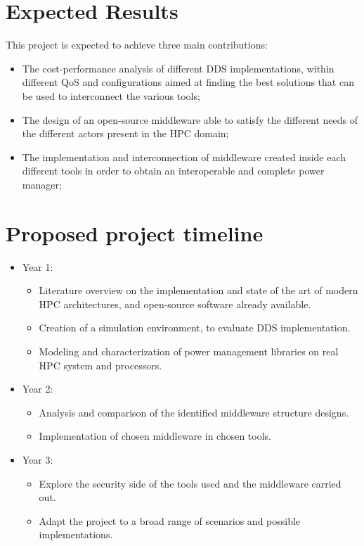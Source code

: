 \section{Expected Results}
This project is expected to achieve three main contributions:
\begin{itemize}
    \item The cost-performance analysis of different DDS implementations, within different QoS and configurations aimed at finding the best solutions that can be used to interconnect the various tools;

    \item The design of an open-source middleware able to satisfy the different needs of the different actors present in the HPC domain;

    \item The implementation and interconnection of middleware created inside each different tools in order to obtain an interoperable and complete power manager;
\end{itemize}

\section{Proposed project timeline}
\begin{itemize}
\item{Year 1:
\begin{itemize}
    \item Literature overview on the implementation and state of the art of modern HPC architectures, and open-source software already available.
    \item Creation of a simulation environment, to evaluate DDS implementation.
    \item Modeling and characterization of power management libraries on real HPC system and processors.
\end{itemize}}
\item{Year 2:
\begin{itemize}
    \item Analysis and comparison of the identified middleware structure designs.
    \item Implementation of chosen middleware in chosen tools.
\end{itemize}}
\item{Year 3:
\begin{itemize}
    \item Explore the security side of the tools used and the middleware carried out.
    \item Adapt the project to a broad range of scenarios and possible implementations.
\end{itemize}}
\end{itemize}

